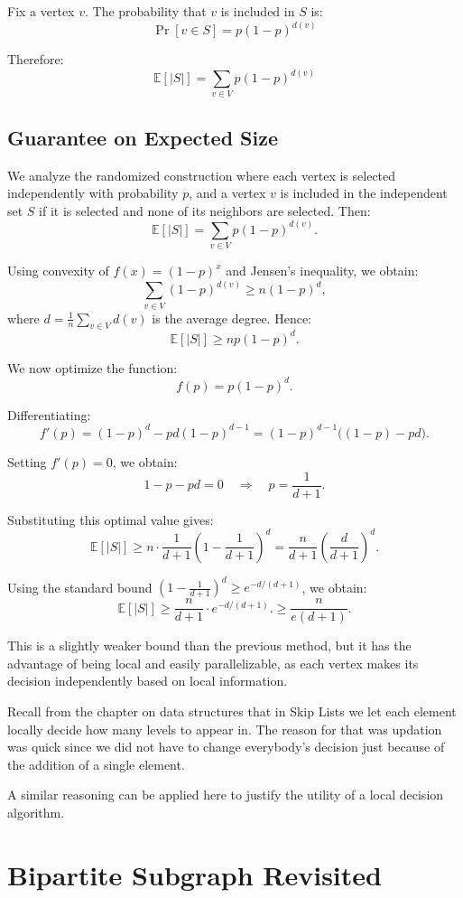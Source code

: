 \documentclass[11pt,openany]{book}
\begin{document}
Fix a vertex \(v\). The probability that \(v\) is included in \(S\) is:
\[
\Pr[v \in S] = p(1-p)^{d(v)}
\]

Therefore:
\[
\mathbb{E}[|S|] = \sum_{v \in V} p(1-p)^{d(v)}
\]

\subsection*{Guarantee on Expected Size}

We analyze the randomized construction where each vertex is selected independently with probability \(p\), and a vertex \(v\) is included in the independent set \(S\) if it is selected and none of its neighbors are selected. Then:
\[
\mathbb{E}[|S|]=\sum_{v\in V} p(1-p)^{d(v)}.
\]

Using convexity of \(f(x)=(1-p)^x\) and Jensen’s inequality, we obtain:
\[
\sum_{v\in V}(1-p)^{d(v)}\ge n(1-p)^d,
\]
where \(d=\frac{1}{n}\sum_{v\in V}d(v)\) is the average degree. Hence:
\[
\mathbb{E}[|S|]\ge np(1-p)^d.
\]

We now optimize the function:
\[
f(p)=p(1-p)^d.
\]

Differentiating:
\[
f'(p)=(1-p)^d - pd(1-p)^{d-1}
=(1-p)^{d-1}\big((1-p)-pd\big).
\]

Setting \(f'(p)=0\), we obtain:
\[
1-p-pd=0
\quad\Rightarrow\quad
p=\frac{1}{d+1}.
\]

Substituting this optimal value gives:
\[
\mathbb{E}[|S|]\ge n\cdot \frac{1}{d+1}\left(1-\frac{1}{d+1}\right)^d
=\frac{n}{d+1}\left(\frac{d}{d+1}\right)^d.
\]

Using the standard bound \(\left(1-\frac{1}{d+1}\right)^d \ge e^{-d/(d+1)}\), we obtain:
\[
\mathbb{E}[|S|]\ge \frac{n}{d+1}\cdot e^{-d/(d+1)}. \ge \frac{n}{e(d+1)}.
\]

This is a slightly weaker bound than the previous method, but it has the advantage of being local and easily parallelizable, 
as each vertex makes its decision independently based on local information. 

Recall from the chapter on data structures that in Skip Lists we let each element 
locally decide how many levels to appear in. The reason for that was updation was quick 
since we did not have to change everybody's decision just because of the addition of a single element.

A similar reasoning can be applied here to justify the utility of a local decision algorithm.
\section{Bipartite Subgraph Revisited}
\end{document}
